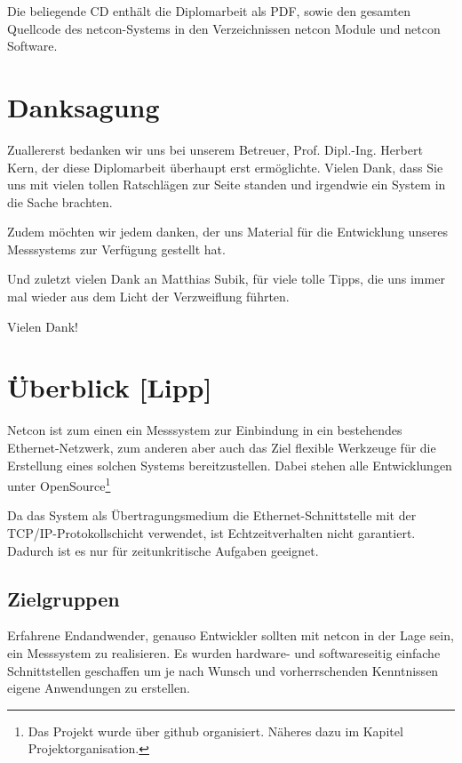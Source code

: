 \documentclass[a4paper,14pt,headsepline]{scrartcl}
\begin{document}
Die beliegende CD enthält die Diplomarbeit als PDF, sowie den gesamten Quellcode des netcon-Systems in den Verzeichnissen netcon Module und netcon Software. 

\newpage

\section*{Danksagung}
Zuallererst bedanken wir uns bei unserem Betreuer, Prof. Dipl.-Ing. Herbert Kern, der diese Diplomarbeit überhaupt erst ermöglichte. Vielen Dank, dass Sie uns mit vielen tollen Ratschlägen zur Seite standen und irgendwie ein System in die Sache brachten.

Zudem möchten wir jedem danken, der uns Material für die Entwicklung unseres Messsystems zur Verfügung gestellt hat.

Und zuletzt vielen Dank an Matthias Subik, für viele tolle Tipps, die uns immer mal wieder aus dem Licht der Verzweiflung führten.

Vielen Dank! 


\newpage


\newpage

\tableofcontents
\newpage


\section{Überblick [Lipp]}

Netcon ist zum einen ein Messsystem zur Einbindung in ein bestehendes Ethernet-Netzwerk, zum anderen aber auch das Ziel flexible Werkzeuge für die Erstellung eines solchen Systems bereitzustellen. Dabei stehen alle Entwicklungen unter OpenSource\footnote{Das Projekt wurde über github organisiert. Näheres dazu im Kapitel Projektorganisation.} 

Da das System als Übertragungsmedium die Ethernet-Schnittstelle mit der TCP/IP-Protokollschicht verwendet, ist Echtzeitverhalten nicht garantiert. Dadurch ist es nur für zeitunkritische Aufgaben geeignet. 

\subsection{Zielgruppen}
Erfahrene Endandwender, genauso Entwickler sollten mit netcon in der Lage sein, ein Messsystem zu realisieren. Es wurden hardware- und softwareseitig einfache Schnittstellen geschaffen um je nach Wunsch und vorherrschenden Kenntnissen eigene Anwendungen zu erstellen. 
\end{document}
